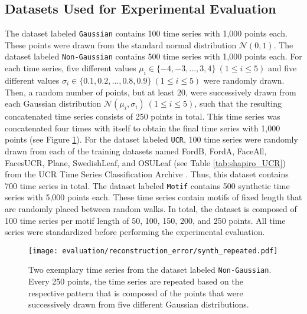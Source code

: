 \subsection*{Datasets Used for Experimental Evaluation}
The dataset labeled \texttt{Gaussian} contains 100 time series with 1,000 points each. These points were drawn from the standard normal distribution $\mathcal{N}(0,1)$. \newline
The dataset labeled \texttt{Non-Gaussian} contains 500 time series with 1,000 points each. For each time series, five different values $\mu_i \in \{-4, -3, ..., 3, 4\} \ (1 \leq i \leq 5)$ and five different values $\sigma_i \in \{0.1, 0.2, ..., 0.8, 0.9\} \ (1 \leq i \leq 5)$ were randomly drawn. Then, a random number of points, but at least 20, were successively drawn from each Gaussian distribution $\mathcal{N}(\mu_i,\sigma_i) \ (1 \leq i \leq 5)$, such that the resulting concatenated time series consists of 250 points in total. This time series was concatenated four times with itself to obtain the final time series with 1,000 points (see Figure \ref{fig:synth_repeated}). \newline
For the dataset labeled \texttt{UCR}, 100 time series were randomly drawn from each of the training datasets named FordB, FordA, FaceAll, FacesUCR, Plane, SwedishLeaf, and OSULeaf (see Table \ref{tab:shapiro_UCR}) from the UCR Time Series Classification Archive \cite{UCR_Archive}. Thus, this dataset contains 700 time series in total. \newline
The dataset labeled \texttt{Motif} contains 500 synthetic time series with 5,000 points each. These time series contain motifs of fixed length that are randomly placed between random walks. In total, the dataset is composed of 100 time series per motif length of 50, 100, 150, 200, and 250 points. \newline
All time series were standardized before performing the experimental evaluation.
\begin{figure}[htb]
\centering
\texttt{[image: evaluation/reconstruction\_error/synth\_repeated.pdf]}
\caption[Reconstruction Error - Synthetic Repeating Time Series]{Two exemplary time series from the dataset labeled \texttt{Non-Gaussian}. Every 250 points, the time series are repeated based on the respective pattern that is composed of the points that were successively drawn from five different Gaussian distributions.}
\label{fig:synth_repeated}
\end{figure}
